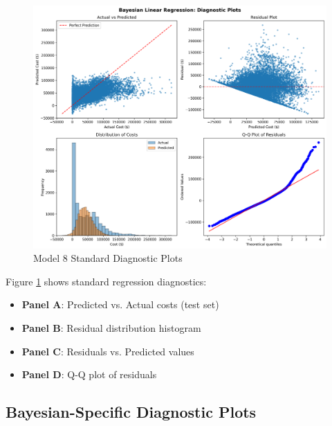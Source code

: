 \begin{figure}[h!]
\centering
\includegraphics[width=\textwidth]{models/model_8/diagnostic_plots.png}
\caption{Model 8 Standard Diagnostic Plots}
\label{fig:model8_standard}
\end{figure}

Figure \ref{fig:model8_standard} shows standard regression diagnostics:
\begin{itemize}
    \item \textbf{Panel A}: Predicted vs. Actual costs (test set)
    \item \textbf{Panel B}: Residual distribution histogram
    \item \textbf{Panel C}: Residuals vs. Predicted values
    \item \textbf{Panel D}: Q-Q plot of residuals
\end{itemize}

\subsection{Bayesian-Specific Diagnostic Plots}

